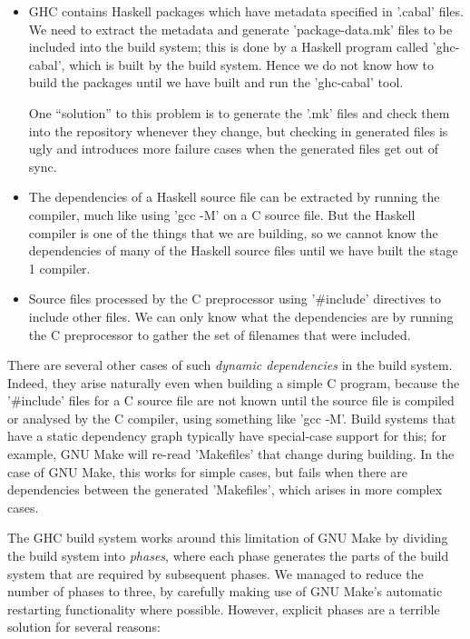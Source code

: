 \begin{itemize}
\item GHC contains Haskell packages which have metadata specified in
  \lst'.cabal' files. We need to extract the metadata and generate
  \lst'package-data.mk' files to be included into the build system; this
  is done by a Haskell program called \lst'ghc-cabal', which is built by the
  build system. Hence we do not know how to build the packages until we have
  built and run the \lst'ghc-cabal' tool.

  One ``solution'' to this problem is to generate the \lst'.mk'
  files and check them into the repository whenever they change, but
  checking in generated files is ugly and introduces more failure
  cases when the generated files get out of sync.

\item The dependencies of a Haskell source file can be extracted by
  running the compiler, much like using \lst'gcc -M' on a C source
  file.  But the Haskell compiler is one of the things that we are
  building, so we cannot know the dependencies of many of the Haskell
  source files until we have built the stage 1 compiler.

\item Source files processed by the C preprocessor using
  \lst'#include' directives to include other files.  We can only
  know what the dependencies are by running the C preprocessor to
  gather the set of filenames that were included.
\end{itemize}

There are several other cases of such \emph{dynamic dependencies} in the build
system. Indeed, they arise naturally even when building a simple C program,
because the \lst'#include' files for a C source file are not known until the
source file is compiled or analysed by the C compiler, using something like
\lst'gcc -M'. Build systems that have a static dependency graph typically have
special-case support for this; for example, GNU Make will re-read
\lst'Makefiles' that change during building.  In the case of GNU Make,
this works for simple cases, but fails when there are dependencies
between the generated \lst'Makefiles', which arises in more complex cases.

The GHC build system works around this limitation of GNU Make by
dividing the build system into \emph{phases}, where each phase
generates the parts of the build system that are required by
subsequent phases. We managed to reduce the number of phases to
three, by carefully making use of GNU Make's automatic restarting
functionality where possible. However, explicit phases are a terrible
solution for several reasons:

